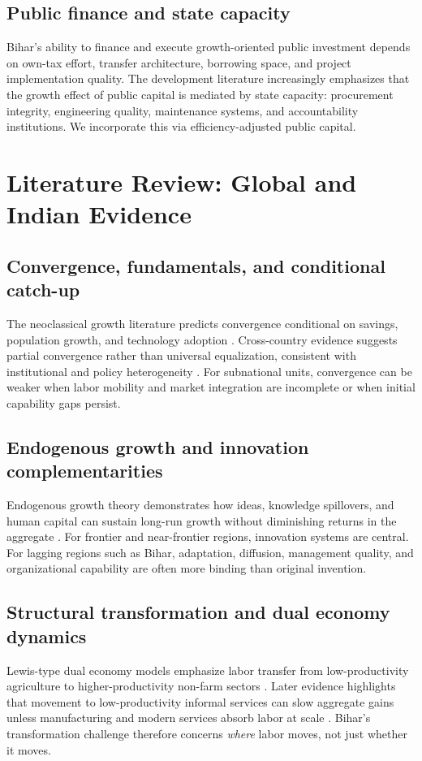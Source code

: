 \documentclass[preprint,12pt]{elsarticle}
\begin{document}
\subsection{Public finance and state capacity}
Bihar's ability to finance and execute growth-oriented public investment depends on own-tax effort, transfer architecture, borrowing space, and project implementation quality. The development literature increasingly emphasizes that the growth effect of public capital is mediated by state capacity: procurement integrity, engineering quality, maintenance systems, and accountability institutions. We incorporate this via efficiency-adjusted public capital.

\section{Literature Review: Global and Indian Evidence}
\subsection{Convergence, fundamentals, and conditional catch-up}
The neoclassical growth literature predicts convergence conditional on savings, population growth, and technology adoption \citep{solow1956,swan1956,mankiw1992}. Cross-country evidence suggests partial convergence rather than universal equalization, consistent with institutional and policy heterogeneity \citep{barro1991,islam1995}. For subnational units, convergence can be weaker when labor mobility and market integration are incomplete or when initial capability gaps persist.

\subsection{Endogenous growth and innovation complementarities}
Endogenous growth theory demonstrates how ideas, knowledge spillovers, and human capital can sustain long-run growth without diminishing returns in the aggregate \citep{romer1986,romer1990,lucas1988,aghion1992}. For frontier and near-frontier regions, innovation systems are central. For lagging regions such as Bihar, adaptation, diffusion, management quality, and organizational capability are often more binding than original invention.

\subsection{Structural transformation and dual economy dynamics}
Lewis-type dual economy models emphasize labor transfer from low-productivity agriculture to higher-productivity non-farm sectors \citep{lewis1954,fei1964}. Later evidence highlights that movement to low-productivity informal services can slow aggregate gains unless manufacturing and modern services absorb labor at scale \citep{mcmillan2014,rodrik2016}. Bihar's transformation challenge therefore concerns \emph{where} labor moves, not just whether it moves.
\end{document}
